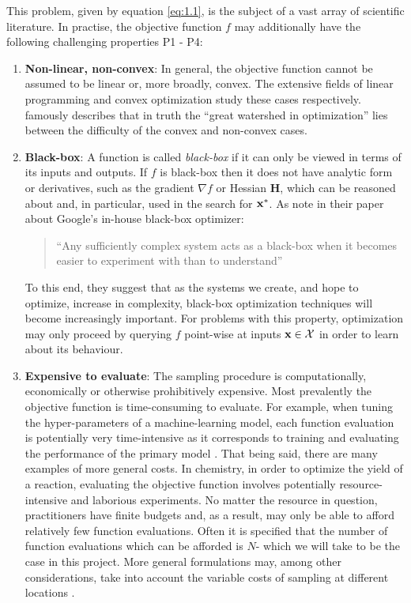 This problem, given by equation \ref{eq:1.1}, is the subject of a vast array of scientific literature. In practise, the objective function $f$ may additionally have the following challenging properties P1 - P4:
%
\begin{enumerate}[label={P}{\arabic*}]
\item{ \label{itm:p1}
\textbf{Non-linear, non-convex}: In general, the objective function cannot be assumed to be linear or, more broadly, convex. The extensive fields of linear programming and convex optimization study these cases respectively. \citet{rockafellar1993lagrange} famously describes that in truth the ``great watershed in optimization'' lies between the difficulty of the convex and non-convex cases.
}
\item{ \label{itm:p2}
\textbf{Black-box}: A function is called \textit{black-box} if it can only be viewed in terms of its inputs and outputs. If $f$ is black-box then it does not have analytic form or derivatives, such as the gradient $\nabla f$ or Hessian $\mathbf{H}$, which can be reasoned about and, in particular, used in the search for $\mathbf{x}^*$. As \citet{vizier} note in their paper about Google's in-house black-box optimizer:
%
\begin{quotation}
``Any sufficiently complex system acts as a black-box when it becomes easier to experiment with than to understand''
\end{quotation}
%
To this end, they suggest that as the systems we create, and hope to optimize, increase in complexity, black-box optimization techniques will become increasingly important. For problems with this property, optimization may only proceed by querying $f$ point-wise at inputs $\mathbf{x}\in\mathcal{X}$ in order to learn about its behaviour.
}
\item{ \label{itm:p3}
\textbf{Expensive to evaluate}: The sampling procedure is computationally, economically or otherwise prohibitively expensive. Most prevalently the objective function is time-consuming to evaluate. For example, when tuning the hyper-parameters of a machine-learning model, each function evaluation is potentially very time-intensive as it corresponds to training and evaluating the performance of the primary model \citep{snoek2012practical}. That being said, there are many examples of more general costs. In chemistry, in order to optimize the yield of a reaction, evaluating the objective function involves potentially resource-intensive and laborious experiments. No matter the resource in question, practitioners have finite budgets and, as a result, may only be able to afford relatively few function evaluations. Often it is specified that the number of function evaluations which can be afforded is $N$- which we will take to be the case in this project. More general formulations may, among other considerations, take into account the variable costs of sampling at different locations \cite{snoek2012practical}.
}
\end{enumerate}
